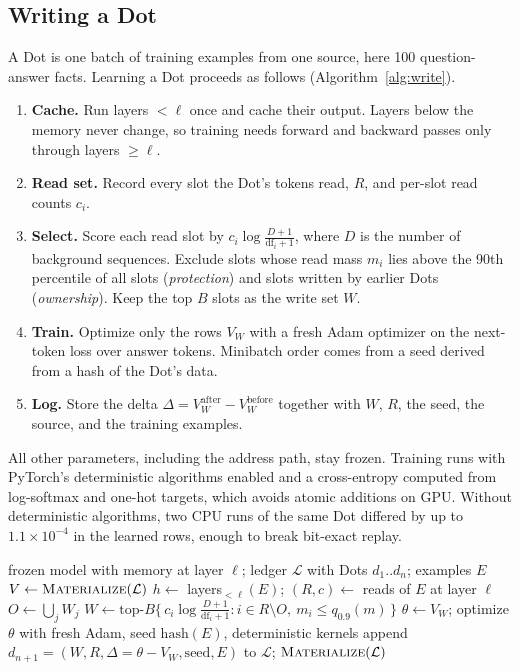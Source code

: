 \documentclass[11pt]{article}
\begin{document}
\subsection{Writing a Dot}
\label{sec:write}

A Dot is one batch of training examples from one source, here 100 question-answer facts. Learning a Dot proceeds as follows (Algorithm~\ref{alg:write}).

\begin{enumerate}
  \item \textbf{Cache.} Run layers $<\ell$ once and cache their output. Layers below the memory never change, so training needs forward and backward passes only through layers $\geq\ell$.
  \item \textbf{Read set.} Record every slot the Dot's tokens read, $R$, and per-slot read counts $c_i$.
  \item \textbf{Select.} Score each read slot by $c_i \log\frac{D+1}{\mathrm{df}_i+1}$, where $D$ is the number of background sequences. Exclude slots whose read mass $m_i$ lies above the 90th percentile of all slots (\emph{protection}) and slots written by earlier Dots (\emph{ownership}). Keep the top $B$ slots as the write set $W$.
  \item \textbf{Train.} Optimize only the rows $V_W$ with a fresh Adam optimizer \citep{kingma2015adam} on the next-token loss over answer tokens. Minibatch order comes from a seed derived from a hash of the Dot's data.
  \item \textbf{Log.} Store the delta $\Delta = V_W^{\text{after}} - V_W^{\text{before}}$ together with $W$, $R$, the seed, the source, and the training examples.
\end{enumerate}

All other parameters, including the address path, stay frozen. Training runs with PyTorch's deterministic algorithms enabled \citep{pytorchrepro} and a cross-entropy computed from log-softmax and one-hot targets, which avoids atomic additions on GPU. Without deterministic algorithms, two CPU runs of the same Dot differed by up to $1.1\times10^{-4}$ in the learned rows, enough to break bit-exact replay.

\begin{algorithm}[t]
\caption{Learning a Dot and recording it in the ledger}
\label{alg:write}
\begin{algorithmic}[1]
\Require frozen model with memory at layer $\ell$; ledger $\mathcal{L}$ with Dots $d_1..d_n$; examples $E$
\State $V \gets \textsc{Materialize}(\mathcal{L})$ 
\State $h \gets$ layers$_{<\ell}(E)$; \; $(R, c) \gets$ reads of $E$ at layer $\ell$
\State $O \gets \bigcup_j W_j$ 
\State $W \gets \mathrm{top}\text{-}B\{\, c_i \log\frac{D+1}{\mathrm{df}_i+1} : i \in R \setminus O,\ m_i \le q_{0.9}(m) \,\}$
\State $\theta \gets V_W$; optimize $\theta$ with fresh Adam, seed $\mathrm{hash}(E)$, deterministic kernels
\State append $d_{n+1} = (W, R, \Delta = \theta - V_W, \mathrm{seed}, E)$ to $\mathcal{L}$; \Return $\textsc{Materialize}(\mathcal{L})$
\end{algorithmic}
\end{algorithm}
\end{document}
